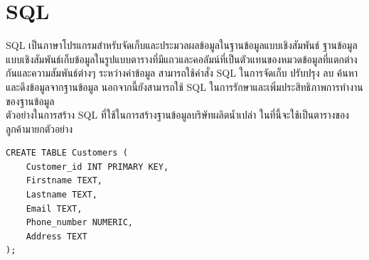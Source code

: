 \documentclass{report}
\begin{document}
\chapter{SQL}
SQL เป็นภาษาโปรแกรมสำหรับจัดเก็บและประมวลผลข้อมูลในฐานข้อมูลแบบเชิงสัมพันธ์ ฐานข้อมูลแบบเชิงสัมพันธ์เก็บข้อมูลในรูปแบบตารางที่มีแถวและคอลัมน์ที่เป็นตัวแทนของหมวดข้อมูลที่แตกต่างกันและความสัมพันธ์ต่างๆ ระหว่างค่าข้อมูล สามารถใช้คำสั่ง SQL ในการจัดเก็บ ปรับปรุง ลบ ค้นหา และดึงข้อมูลจากฐานข้อมูล นอกจากนี้ยังสามารถใช้ SQL ในการรักษาและเพิ่มประสิทธิภาพการทำงานของฐานข้อมูล\\
ตัวอย่างในการสร้าง SQL ที่ใช้ในการสร้างฐานข้อมูลบริษัทผลิตน้ำเปล่า ในที่นี้จะใช้เป็นตารางของลูกค้ามายกตัวอย่าง\\
\begin{verbatim}
CREATE TABLE Customers (
    Customer_id INT PRIMARY KEY,
    Firstname TEXT,
    Lastname TEXT,
    Email TEXT,
    Phone_number NUMERIC,
    Address TEXT
);
\end{verbatim}\\
\end{document}
